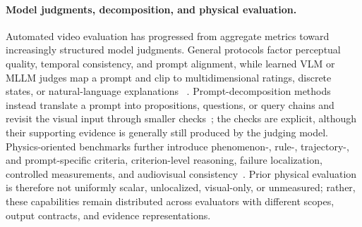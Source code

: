 \paragraph{Model judgments, decomposition, and physical evaluation.}
Automated video evaluation has progressed from aggregate metrics toward
increasingly structured model judgments. General protocols factor perceptual
quality, temporal consistency, and prompt alignment, while learned VLM or MLLM
judges map a prompt and clip to multidimensional ratings, discrete states, or
natural-language explanations
~\cite{vbench2024,t2vcompbench2024,fetv2023,evalcrafter2024,
videoscore2024,videoscore2_2025}. Prompt-decomposition methods instead translate
a prompt into propositions, questions, or query chains and revisit the visual
input through smaller checks~\cite{tifa2023,dsg2024,vqascore2024,
han2025videobench}; the checks are explicit, although their supporting evidence
is generally still produced by the judging model. Physics-oriented benchmarks
further introduce
phenomenon-, rule-, trajectory-, and prompt-specific criteria, criterion-level
reasoning, failure localization, controlled measurements, and audiovisual
consistency~\cite{videophy2024,videophy2_2025,phygenbench2024,physicsiq2025,
phycobench2025,phyworldbench2026,lin2026phyground,physioneval2026,
chinchure2026spotlight,luo2026lovif,wang2026gauge,xie2025phyavbench,
zhou2026avgenbench,cui2026avphys}. Prior physical evaluation is therefore not
uniformly scalar, unlocalized, visual-only, or unmeasured; rather, these
capabilities remain distributed across evaluators with different scopes, output
contracts, and evidence representations.

